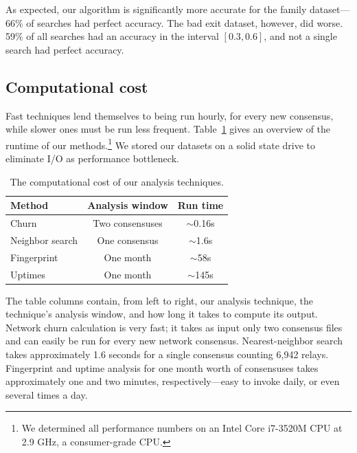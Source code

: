 As expected, our algorithm is significantly more accurate for the family
dataset---66\% of searches had perfect accuracy.  The bad exit dataset, however,
did worse.  59\% of all searches had an accuracy in the interval $[0.3,0.6]$,
and not a single search had perfect accuracy.

\subsection{Computational cost}
\label{sec:performance}
Fast techniques lend themselves to being run hourly, for every new consensus,
while slower ones must be run less frequent.  Table~\ref{tab:exp-deployment}
gives an overview of the runtime of our methods.\footnote{We determined all
performance numbers on an Intel Core i7-3520M CPU at 2.9 GHz, a consumer-grade
CPU.}  We stored our datasets on a solid state drive to eliminate I/O as
performance bottleneck.

\begin{table}[t]
	\small
	\centering
	\begin{tabular}{lcc}
	\hline
	\textbf{Method} & \textbf{Analysis window} & \textbf{Run time} \\
	\hline
	Churn & Two consensuses & $\sim$0.16s \\
	Neighbor search & One consensus & $\sim$1.6s \\
	Fingerprint & One month & $\sim$58s \\
	Uptimes & One month & $\sim$145s \\
	\hline
	\end{tabular}
	\caption{The computational cost of our analysis techniques.}
	\label{tab:exp-deployment}
\end{table}

The table columns contain, from left to right, our analysis technique, the
technique's analysis window, and how long it takes to compute its output.
Network churn calculation is very fast; it takes as input only two consensus
files and can easily be run for every new network consensus.  Nearest-neighbor
search takes approximately 1.6 seconds for a single consensus counting 6,942
relays.  Fingerprint and uptime analysis for one month worth of consensuses
takes approximately one and two minutes, respectively---easy to invoke daily, or
even several times a day.
